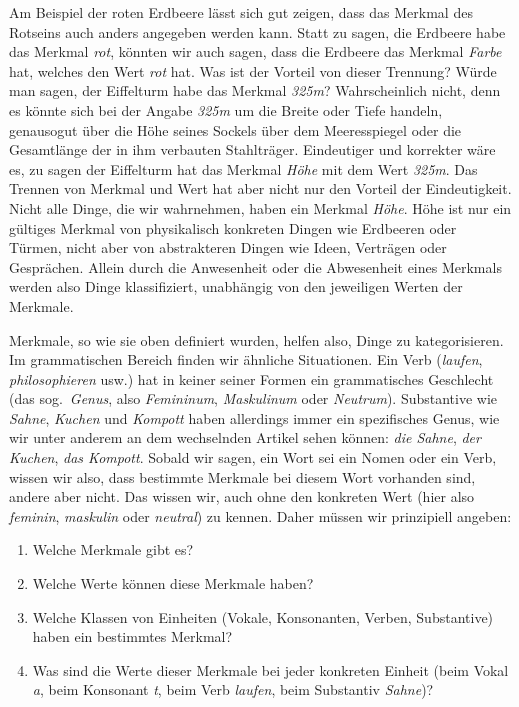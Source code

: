 Am Beispiel der roten Erdbeere lässt sich gut zeigen, dass das Merkmal des Rotseins auch anders angegeben werden kann.
Statt zu sagen, die Erdbeere habe das Merkmal \textit{rot}, könnten wir auch sagen, dass die Erdbeere das Merkmal \textit{Farbe} hat, welches den Wert \textit{rot} hat.
Was ist der Vorteil von dieser Trennung?
Würde man sagen, der Eiffelturm habe das Merkmal \textit{325m}?
Wahrscheinlich nicht, denn es könnte sich bei der Angabe \textit{325m} um die Breite oder Tiefe handeln, genausogut über die Höhe seines Sockels über dem Meeresspiegel oder die Gesamtlänge der in ihm verbauten Stahlträger.
Eindeutiger und korrekter wäre es, zu sagen der Eiffelturm hat das Merkmal \textit{Höhe} mit dem Wert \textit{325m}.
Das Trennen von Merkmal und Wert hat aber nicht nur den Vorteil der Eindeutigkeit.
Nicht alle Dinge, die wir wahrnehmen, haben ein Merkmal \textit{Höhe}.
Höhe ist nur ein gültiges Merkmal von physikalisch konkreten Dingen wie Erdbeeren oder Türmen, nicht aber von abstrakteren Dingen wie Ideen, Verträgen oder Gesprächen.
Allein durch die Anwesenheit oder die Abwesenheit eines Merkmals werden also Dinge klassifiziert, unabhängig von den jeweiligen Werten der Merkmale.


Merkmale, so wie sie oben definiert wurden, helfen also, Dinge zu kategorisieren.
Im grammatischen Bereich finden wir ähnliche Situationen.
Ein Verb (\textit{laufen}, \textit{philosophieren} usw.) hat in keiner seiner Formen ein grammatisches Geschlecht (das sog.\ \textit{Genus}, also \textit{Femininum}, \textit{Maskulinum} oder \textit{Neutrum}).
Substantive wie \textit{Sahne}, \textit{Kuchen} und \textit{Kompott} haben allerdings immer ein spezifisches Genus, wie wir unter anderem an dem wechselnden Artikel sehen können: \textit{die Sahne}, \textit{der Kuchen}, \textit{das Kompott}.
Sobald wir sagen, ein Wort sei ein Nomen oder ein Verb, wissen wir also, dass bestimmte Merkmale bei diesem Wort vorhanden sind, andere aber nicht.
Das wissen wir, auch ohne den konkreten Wert (hier also \textit{feminin}, \textit{maskulin} oder \textit{neutral}) zu kennen.
Daher müssen wir prinzipiell angeben:

\begin{enumerate}\Lf
  \item Welche Merkmale gibt es?
  \item Welche Werte können diese Merkmale haben?
  \item Welche Klassen von Einheiten (\zB Vokale, Konsonanten, Verben, Substantive) haben ein bestimmtes Merkmal?
  \item Was sind die Werte dieser Merkmale bei jeder konkreten Einheit (beim Vokal \textit{a}, beim Konsonant \textit{t}, beim Verb \textit{laufen}, beim Substantiv \textit{Sahne})?
\end{enumerate}


